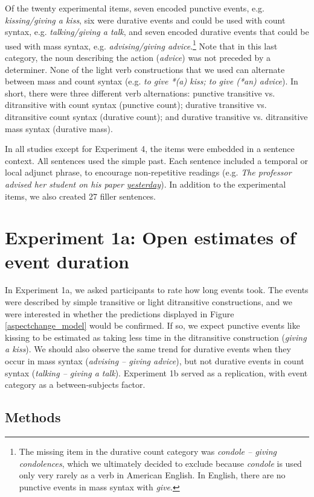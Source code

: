 \documentclass[review,12pt,authoryear]{elsarticle}
\newcommand*{\sectionformat}{\centering}
\begin{document}
Of the twenty experimental items, seven encoded punctive events, e.g. \emph{kissing/giving a kiss}, six were durative events and could be used with count syntax, e.g. \emph{talking/giving a talk}, and seven encoded durative events that could be used with mass syntax, e.g. \emph{advising/giving advice}.\footnote{The missing item in the durative count category was \emph{condole -- giving condolences}, which we ultimately decided to exclude because \emph{condole} is used only very rarely as a verb in American English. In English, there are no punctive events in mass syntax with \emph{give}.} Note that in this last category, the noun describing the action (\emph{advice}) was not preceded by a determiner. None of the light verb constructions that we used can alternate between mass and count syntax (e.g. \emph{to give *(a) kiss; to give (*an) advice}). In short, there were three different verb alternations: punctive transitive vs. ditransitive with count syntax (punctive count); durative transitive vs. ditransitive count syntax (durative count); and durative transitive vs. ditransitive mass syntax (durative mass).

In all studies except for Experiment 4, the items were embedded in a sentence context. All sentences used the simple past. Each sentence included a temporal or local adjunct phrase, to encourage non-repeti\-tive readings (e.g. \emph{The professor advised her student on his paper \underline{yesterday}}). In addition to the experimental items, we also created 27 filler sentences.

\section*{\sectionformat Experiment 1a: Open estimates of event duration} \label{sec_expOE}
In Experiment 1a, we asked participants to rate how long events took. The events were described by simple transitive or light ditransitive constructions, and we were interested in whether the predictions displayed in Figure \ref{aspectchange_model} would be confirmed. If so, we expect punctive events like {kissing} to be estimated as taking less time in the ditransitive construction (\emph{giving a kiss}). We should also observe the same trend for durative events when they occur in mass syntax (\emph{advising -- giving advice}), but not durative events in count syntax (\emph{talking -- giving a talk}). Experiment 1b served as a replication, with event category as a between-subjects factor.

\subsection*{\sectionformat Methods}
\end{document}
